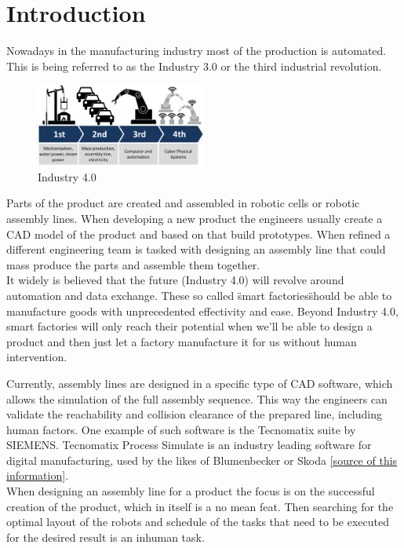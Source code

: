 \chapter{Introduction}
\graphicspath{ {chapters/Introduction/} }

Nowadays in the manufacturing industry most of the production is automated. This is being referred to as the Industry 3.0 or the third industrial revolution. \\ 

\begin{figure}
	\caption{Industry 4.0 \cite{pictIndustry40}}
	\centering
	  \includegraphics[width=0.5\textwidth]{industry-40.png}
\end{figure}

	
 Parts of the product are created and assembled in robotic cells or robotic assembly lines. When developing a new product the engineers usually create a CAD model of the product and based on that build prototypes. When refined a different engineering team is tasked with designing an assembly line that could mass produce the parts and assemble them together. \\
 
It widely is believed that the future (Industry 4.0) will revolve around automation and data exchange. These so called \"smart factories\" should be able to manufacture goods with unprecedented effectivity and ease. Beyond Industry 4.0, smart factories will only reach their potential when we'll be able to design a product and then just let a factory manufacture it for us without human intervention.   

Currently, assembly lines are designed in a specific type of CAD software, which allows the simulation of the full assembly sequence. This way the engineers can validate the reachability and collision clearance of the prepared line, including human factors. One example of such software is the Tecnomatix suite by SIEMENS. Tecnomatix Process Simulate is an industry leading software for digital manufacturing, used by the likes of Blumenbecker or Skoda \ref{source of this information}. \\ 

When designing an assembly line for a product the focus is on the successful creation of the product, which in itself is a no mean feat. Then searching for the optimal layout of the robots and schedule of the tasks that need to be executed for the desired result is an inhuman task. 

